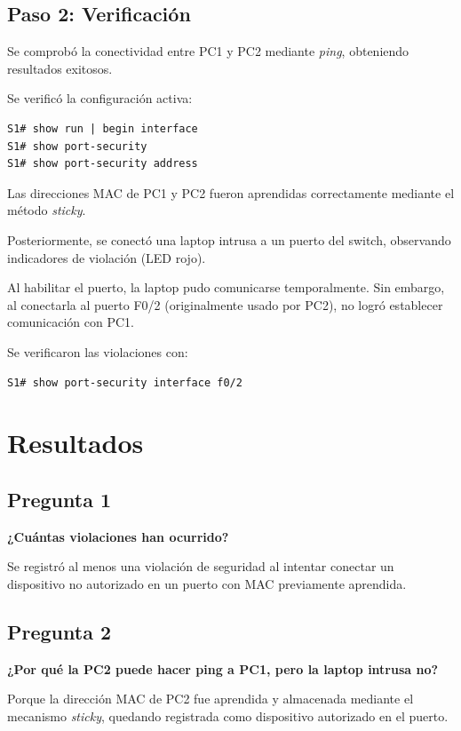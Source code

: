 \documentclass[12pt]{article}
\begin{document}
\subsection{Paso 2: Verificación}

Se comprobó la conectividad entre PC1 y PC2 mediante \textit{ping}, obteniendo resultados exitosos.

Se verificó la configuración activa:

\begin{lstlisting}
S1# show run | begin interface
S1# show port-security
S1# show port-security address
\end{lstlisting}

Las direcciones MAC de PC1 y PC2 fueron aprendidas correctamente mediante el método \textit{sticky}.

Posteriormente, se conectó una laptop intrusa a un puerto del switch, observando indicadores de violación (LED rojo).

Al habilitar el puerto, la laptop pudo comunicarse temporalmente. Sin embargo, al conectarla al puerto F0/2 (originalmente usado por PC2), no logró establecer comunicación con PC1.

Se verificaron las violaciones con:

\begin{lstlisting}
S1# show port-security interface f0/2
\end{lstlisting}

\section{Resultados}

\subsection{Pregunta 1}
\textbf{¿Cuántas violaciones han ocurrido?}

Se registró al menos una violación de seguridad al intentar conectar un dispositivo no autorizado en un puerto con MAC previamente aprendida.

\subsection{Pregunta 2}
\textbf{¿Por qué la PC2 puede hacer ping a PC1, pero la laptop intrusa no?}

Porque la dirección MAC de PC2 fue aprendida y almacenada mediante el mecanismo \textit{sticky}, quedando registrada como dispositivo autorizado en el puerto. 
\end{document}
